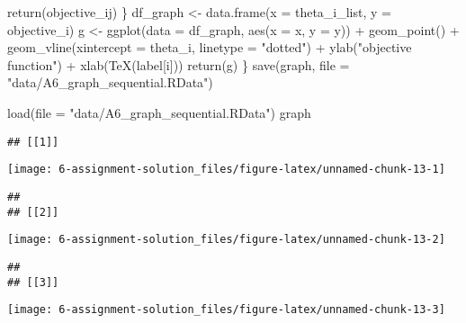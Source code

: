 \documentclass[
]{article}
\newenvironment{Shaded}{\begin{snugshade}}{\end{snugshade}}
\newcommand{\AttributeTok}[1]{\textcolor[rgb]{0.77,0.63,0.00}{#1}}
\newcommand{\FunctionTok}[1]{\textcolor[rgb]{0.00,0.00,0.00}{#1}}
\newcommand{\NormalTok}[1]{#1}
\newcommand{\OtherTok}[1]{\textcolor[rgb]{0.56,0.35,0.01}{#1}}
\newcommand{\SpecialCharTok}[1]{\textcolor[rgb]{0.00,0.00,0.00}{#1}}
\newcommand{\StringTok}[1]{\textcolor[rgb]{0.31,0.60,0.02}{#1}}
\begin{document}
\begin{Shaded}
\begin{Highlighting}[]
               \FunctionTok{return}\NormalTok{(objective\_ij)}
\NormalTok{             \}}
\NormalTok{  df\_graph }\OtherTok{\textless{}{-}} \FunctionTok{data.frame}\NormalTok{(}\AttributeTok{x =}\NormalTok{ theta\_i\_list, }\AttributeTok{y =}\NormalTok{ objective\_i) }
\NormalTok{  g }\OtherTok{\textless{}{-}} \FunctionTok{ggplot}\NormalTok{(}\AttributeTok{data =}\NormalTok{ df\_graph, }\FunctionTok{aes}\NormalTok{(}\AttributeTok{x =}\NormalTok{ x, }\AttributeTok{y =}\NormalTok{ y)) }\SpecialCharTok{+} 
    \FunctionTok{geom\_point}\NormalTok{() }\SpecialCharTok{+}
    \FunctionTok{geom\_vline}\NormalTok{(}\AttributeTok{xintercept =}\NormalTok{ theta\_i, }\AttributeTok{linetype =} \StringTok{"dotted"}\NormalTok{) }\SpecialCharTok{+}
    \FunctionTok{ylab}\NormalTok{(}\StringTok{"objective function"}\NormalTok{) }\SpecialCharTok{+} \FunctionTok{xlab}\NormalTok{(}\FunctionTok{TeX}\NormalTok{(label[i]))}
  \FunctionTok{return}\NormalTok{(g)}
\NormalTok{\}}
\FunctionTok{save}\NormalTok{(graph, }\AttributeTok{file =} \StringTok{"data/A6\_graph\_sequential.RData"}\NormalTok{)}
\end{Highlighting}
\end{Shaded}

\begin{Shaded}
\begin{Highlighting}[]
\FunctionTok{load}\NormalTok{(}\AttributeTok{file =} \StringTok{"data/A6\_graph\_sequential.RData"}\NormalTok{)}
\NormalTok{graph}
\end{Highlighting}
\end{Shaded}

\begin{verbatim}
## [[1]]
\end{verbatim}

\begin{center}\texttt{[image: 6-assignment-solution\_files/figure-latex/unnamed-chunk-13-1]} \end{center}

\begin{verbatim}
## 
## [[2]]
\end{verbatim}

\begin{center}\texttt{[image: 6-assignment-solution\_files/figure-latex/unnamed-chunk-13-2]} \end{center}

\begin{verbatim}
## 
## [[3]]
\end{verbatim}

\begin{center}\texttt{[image: 6-assignment-solution\_files/figure-latex/unnamed-chunk-13-3]} \end{center}
\end{document}
